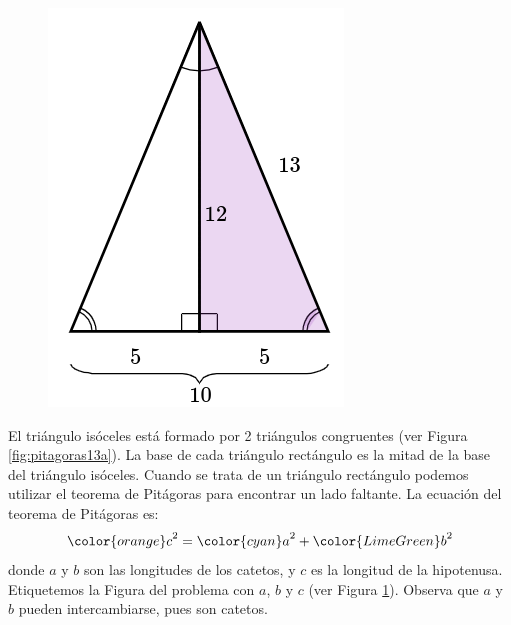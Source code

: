 \begin{solutionbox}{16cm}
\begin{minipage}{0.2\textwidth}
\begin{figure}[H]
            \caption{}
            \label{fig:pitagoras13b}
        \end{figure}
        \begin{figure}[H]
            \centering
            \includegraphics[width=0.8\linewidth]{../images/pitagoras13c.png}
            \caption{}
            \label{fig:pitagoras13c}
        \end{figure}
    \end{minipage}\hfill
    \begin{minipage}{0.75\textwidth}
        El triángulo isóceles está formado por 2 triángulos congruentes (ver Figura \ref{fig:pitagoras13a}).
        La base de cada triángulo rectángulo es la mitad de la base del triángulo isóceles.
        Cuando se trata de un triángulo rectángulo podemos utilizar el teorema de Pitágoras para encontrar un lado faltante.
        La ecuación del teorema de Pitágoras es:
        \[{\color{orange}c}^2={\color{cyan}a}^2+{\color{LimeGreen}b}^2\]
        donde $a$ y $b$ son las longitudes de los catetos, y $c$ es la longitud de la hipotenusa.
        Etiquetemos la Figura del problema con $a$, $b$ y $c$ (ver Figura \ref{fig:pitagoras13b}).
        Observa que $a$ y $b$ pueden intercambiarse, pues son catetos.
        \begin{align*}

\end{align*}
\end{minipage}
\end{solutionbox}
